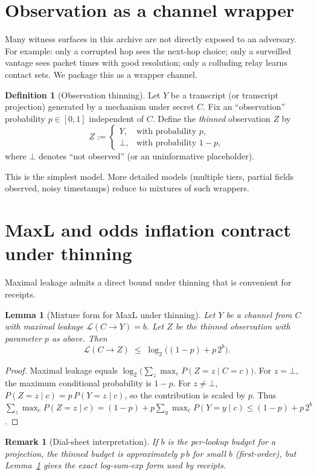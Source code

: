 \documentclass[11pt]{article}
\newtheorem{lemma}{Lemma}
\newtheorem{remark}{Remark}
\theoremstyle{definition}
\newtheorem{definition}{Definition}
\newcommand{\MaxL}{\mathcal{L}}
\begin{document}
\section{Observation as a channel wrapper}
Many witness surfaces in this archive are not directly exposed to an adversary.
For example: only a corrupted hop sees the next-hop choice; only a surveilled vantage sees packet times with good resolution; only a colluding relay learns contact sets.
We package this as a wrapper channel.

\begin{definition}[Observation thinning]
Let $Y$ be a transcript (or transcript projection) generated by a mechanism under secret $C$.
Fix an ``observation'' probability $p\in[0,1]$ independent of $C$.
Define the \emph{thinned} observation $Z$ by
\[ Z := \begin{cases}
Y, & \text{with probability } p,\\
\bot, & \text{with probability } 1-p,
\end{cases} \]
where $\bot$ denotes ``not observed'' (or an uninformative placeholder).
\end{definition}

This is the simplest model. More detailed models (multiple tiers, partial fields observed, noisy timestamps) reduce to mixtures of such wrappers.

\section{MaxL and odds inflation contract under thinning}
Maximal leakage admits a direct bound under thinning that is convenient for receipts.

\begin{lemma}[Mixture form for MaxL under thinning]\label{lem:thin-maxl}
Let $Y$ be a channel from $C$ with maximal leakage $\MaxL(C\to Y)=b$.
Let $Z$ be the thinned observation with parameter $p$ as above.
Then
\[
\MaxL(C\to Z) \;\le\; \log_2\big((1-p) + p\,2^{b}\big).
\]
\end{lemma}
\begin{proof}
Maximal leakage equals $\log_2\big(\sum_z \max_c P(Z=z\mid C=c)\big)$.
For $z=\bot$, the maximum conditional probability is $1-p$.
For $z\neq\bot$, $P(Z=z\mid c)=p\,P(Y=z\mid c)$, so the contribution is scaled by $p$.
Thus $\sum_z \max_c P(Z=z\mid c) = (1-p) + p\sum_y \max_c P(Y=y\mid c) \le (1-p)+p\,2^{b}$.
\end{proof}

\begin{remark}[Dial-sheet interpretation]
If $b$ is the per-lookup budget for a projection, the thinned budget is approximately $p\,b$ for small $b$ (first-order), but Lemma~\ref{lem:thin-maxl} gives the exact log-sum-exp form used by receipts.
\end{remark}
\end{document}
